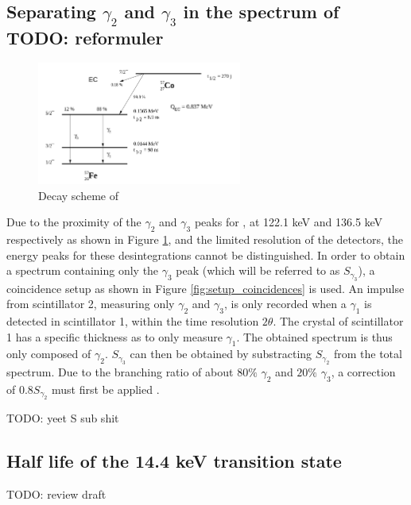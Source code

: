 \subsection{Separating \(\gamma_2\) and \(\gamma_3\) in the spectrum of \cobalt TODO: reformuler}
\label{sec:separation}

\begin{figure}[htbp]
    \centering
    \includegraphics[width=0.6\textwidth]{figures/decay_cobalt57.png}
    \caption{Decay scheme of \cobalt \cite{notice_VI}}
    \label{fig:cobalt_decay}
\end{figure}

Due to the proximity of the \(\gamma_2\) and \(\gamma_3\) peaks for \cobalt, at 122.1 keV and 136.5 keV respectively as shown in Figure \ref{fig:cobalt_decay}, and the limited resolution of the detectors, the energy peaks for these desintegrations cannot be distinguished. In order to obtain a spectrum containing only the \(\gamma_3\) peak (which will be referred to as \(S_{\gamma_3}\)), a coincidence setup as shown in Figure \ref{fig:setup_coincidences} is used. An impulse from scintillator 2, measuring only \(\gamma_2\) and \(\gamma_3\), is only recorded when a \(\gamma_1\) is detected in scintillator 1, within the time resolution \(2\theta\). The crystal of scintillator 1 has a specific thickness as to only measure \(\gamma_1\). The obtained spectrum is thus only composed of \(\gamma_2\). \(S_{\gamma_3}\) can then be obtained by substracting \(S_{\gamma_2}\) from the total spectrum. Due to the branching ratio of about \(80\%\) \(\gamma_2\) and \(20\%\) \(\gamma_3\), a correction of \(0.8 S_{\gamma_2}\) must first be applied \cite{notice_VI}.

TODO: yeet S sub shit

\subsection{Half life of the 14.4 keV transition state}
\label{sec:half_life}

TODO: review draft

